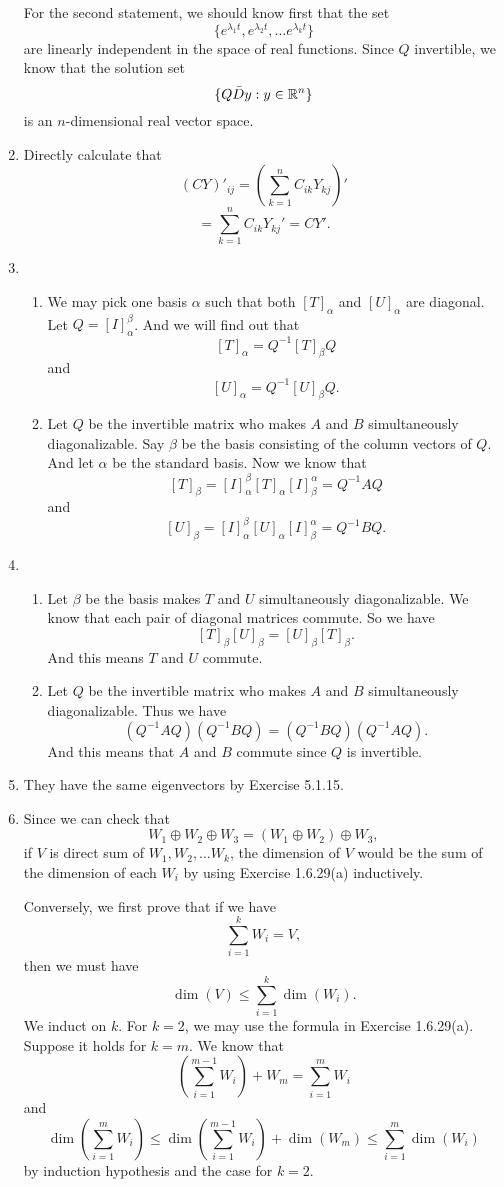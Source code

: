 \begin{enumerate}
For the second statement, we should know first that the set 
\[\{e^{\lambda_1t},e^{\lambda_2t},\ldots e^{\lambda_kt}\}\]
are linearly independent in the space of real functions. Since $Q$ invertible, we know that the solution set 
\[\{Q\bar{D}y:y\in \mathbb{R}^n\}\]
is an $n$-dimensional real vector space.
\item Directly calculate that 
\[(CY)'_{ij}=(\sum_{k=1}^n{C_{ik}Y_{kj}})'\]
\[=\sum_{k=1}^n{C_{ik}Y_{kj}'}=CY'.\]
\item \begin{enumerate}
\item We may pick one basis $\alpha $ such that both $[T]_{\alpha}$ and $[U]_{\alpha}$ are diagonal. Let $Q=[I]_{\alpha}^{\beta}$. And we will find out that 
\[[T]_{\alpha}=Q^{-1}[T]_{\beta}Q\]
and 
\[[U]_{\alpha}=Q^{-1}[U]_{\beta}Q.\]
\item Let $Q$ be the invertible matrix who makes $A$ and $B$ simultaneously diagonalizable. Say $\beta $ be the basis consisting of the column vectors of $Q$. And let $\alpha $ be the standard basis. Now we know that 
\[[T]_{\beta}=[I]_{\alpha}^{\beta}[T]_{\alpha}[I]_{\beta}^{\alpha}=Q^{-1}AQ\]
and 
\[[U]_{\beta}=[I]_{\alpha}^{\beta}[U]_{\alpha}[I]_{\beta}^{\alpha}=Q^{-1}BQ.\]
\end{enumerate}
\item \begin{enumerate}
\item Let $\beta $ be the basis makes $T$ and $U$ simultaneously diagonalizable. We know that each pair of diagonal matrices commute. So we have 
\[[T]_{\beta}[U]_{\beta}=[U]_{\beta}[T]_{\beta}.\]
And this means $T$ and $U$ commute.
\item Let $Q$ be the invertible matrix who makes $A$ and $B$ simultaneously diagonalizable. Thus we have 
\[(Q^{-1}AQ)(Q^{-1}BQ)=(Q^{-1}BQ)(Q^{-1}AQ).\]
And this means that $A$ and $B$ commute since $Q$ is invertible.
\end{enumerate}
\item They have the same eigenvectors by Exercise 5.1.15.
\item Since we can check that
\[W_1\oplus W_2 \oplus W_3=(W_1\oplus W_2)\oplus W_3,\]
if $V$ is direct sum of $W_1,W_2,\ldots W_k$, the dimension of $V$ would be the sum of the dimension of each $W_i$ by using Exercise 1.6.29(a) inductively. 

Conversely, we first prove that if we have 
\[\sum_{i=1}^k{W_i}=V,\]
then we must have 
\[\dim(V)\leq \sum_{i=1}^k{\dim(W_i)}.\]
We induct on $k$. For $k=2$, we may use the formula in Exercise 1.6.29(a). Suppose it holds for $k=m$. We know that 
\[(\sum_{i=1}^{m-1}{W_i})+W_m=\sum_{i=1}^m{W_i}\]
and 
\[\dim(\sum_{i=1}^m{W_i})\leq \dim(\sum_{i=1}^{m-1}{W_i})+\dim(W_m)\leq \sum_{i=1}^m{\dim(W_i)}\]
by induction hypothesis and the case for $k=2$.


\end{enumerate}
